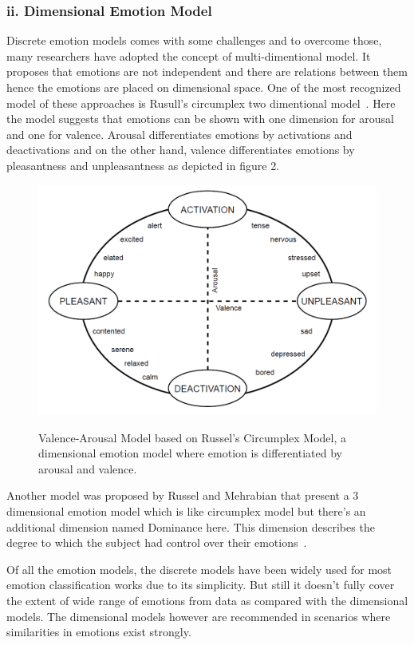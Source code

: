 \documentclass[runningheads]{llncs}
\begin{document}
\subsubsection{ii. Dimensional Emotion Model}

Discrete emotion models comes with some challenges and to overcome those, many researchers have adopted the concept of multi-dimentional model. It proposes that emotions are not independent and there are relations between them hence the emotions are placed on dimensional space. One of the most recognized model of these approaches is Rusull's circumplex two dimentional model~\cite{ref14}. Here the model suggests that emotions can be shown with one dimension for arousal and one for valence. Arousal differentiates emotions by activations and deactivations and on the other hand, valence differentiates emotions by pleasantness and unpleasantness as depicted in figure 2.

\begin{figure}[ht!]
\centering
\includegraphics[scale=0.4]{russel}\label{Russel}
\caption{Valence-Arousal Model based on Russel's Circumplex Model, a dimensional emotion model where emotion is differentiated by arousal and valence. }
\end{figure} 

Another model was proposed by Russel and Mehrabian that present a 3 dimensional emotion model which is like circumplex model but there's an additional dimension named Dominance here. This dimension describes the degree to which the subject had control over their emotions~\cite{ref13,ref12}.

Of all the emotion models, the discrete models have been widely used for most emotion classification works due to its simplicity. But still it doesn't fully cover the extent of wide range of emotions from data as compared with the dimensional models. The dimensional models however are recommended in scenarios where similarities in emotions exist strongly.
\end{document}

